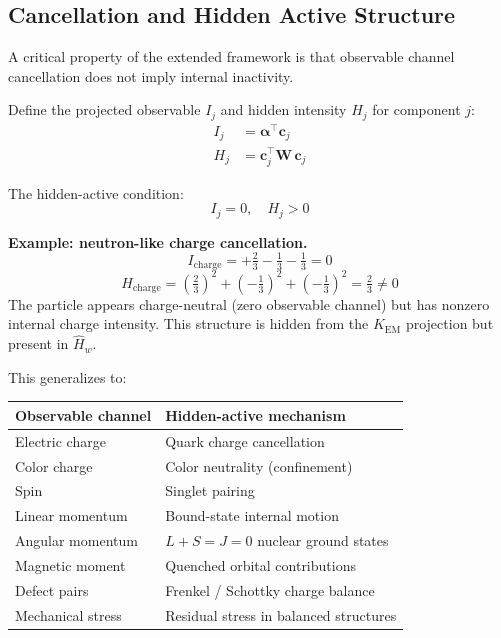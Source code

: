 \documentclass[11pt, a4paper, oneside]{article}
\theoremstyle{definition}
\theoremstyle{plain}
\theoremstyle{remark}
\begin{document}
\subsection{Cancellation and Hidden Active Structure}

A critical property of the extended framework is that observable channel
cancellation does not imply internal inactivity.

Define the projected observable $I_j$ and hidden intensity $H_j$ for
component $j$:
\begin{align}
  I_j &= \bm{\alpha}^\top \mathbf{c}_j \label{eq:observable-channel}\\
  H_j &= \mathbf{c}_j^\top \mathbf{W}\, \mathbf{c}_j \label{eq:hidden-intensity}
\end{align}

The hidden-active condition:
\begin{equation}
  \boxed{I_j = 0, \quad H_j > 0}
  \label{eq:hidden-active}
\end{equation}

\textbf{Example: neutron-like charge cancellation.}
\begin{equation}
  I_\text{charge} = +\tfrac{2}{3} - \tfrac{1}{3} - \tfrac{1}{3} = 0
\end{equation}
\begin{equation}
  H_\text{charge}
  = \left(\tfrac{2}{3}\right)^2
  + \left(-\tfrac{1}{3}\right)^2
  + \left(-\tfrac{1}{3}\right)^2
  = \tfrac{2}{3} \neq 0
\end{equation}
The particle appears charge-neutral (zero observable channel) but has
nonzero internal charge intensity. This structure is hidden from the
$K_\text{EM}$ projection but present in $\hat{H}_w$.

This generalizes to:
\begin{center}
  \begin{tabular}{ll}
	\toprule
	Observable channel & Hidden-active mechanism \\
	\midrule
	Electric charge & Quark charge cancellation \\
	Color charge & Color neutrality (confinement) \\
	Spin & Singlet pairing \\
	Linear momentum & Bound-state internal motion \\
	Angular momentum & $L + S = J = 0$ nuclear ground states \\
	Magnetic moment & Quenched orbital contributions \\
	Defect pairs & Frenkel / Schottky charge balance \\
	Mechanical stress & Residual stress in balanced structures \\
	\bottomrule
  \end{tabular}
\end{center}
\end{document}
